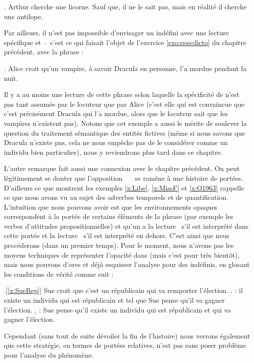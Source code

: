 \ex. \label{x:antilope}
Arthur cherche une licorne. Sauf que, il ne le sait pas, mais en réalité il cherche une antilope.

Par ailleurs, il n'est pas impossible d'envisager un indéfini avec une lecture spécifique et {\dedicto} --~c'est ce qui faisait l'objet de l'exercice \ref{exo:specdicto} du chapitre précédent, avec la phrase :

\ex. 
Alice croit qu'un vampire, à savoir Dracula en personne, l'a mordue
pendant la nuit.

Il y a au moins une lecture de cette phrase selon laquelle la spécificité de  n'est pas tant assumée par le locuteur que par Alice (c'est elle qui est convaincue que c'est précisément Dracula qui l'a mordue, alors que le locuteur sait que les vampires n'existent pas). Notons que cet exemple a aussi le mérite de soulever la question du traitement sémantique des entités fictives (même si nous savons que Dracula n'existe pas, cela ne nous empêche pas de le considérer comme un individu bien particulier), nous y reviendrons plus tard dans ce chapitre.

L'autre remarque fait aussi une connexion avec le chapitre précédent. On peut légitimement se douter que l'opposition \dedicto\ \vs\ \dere\ se ramène à  une histoire de portées. D'ailleurs ce que montrent les exemples \ref{x:Libe}, \ref{x:MissF} et \ref{x:O1963} rappelle ce que nous avons vu au sujet des adverbes temporels et de quantification.  L'intuition que nous pouvons avoir est que les environnements opaques correspondent à la portée de certains éléments de la phrase (par exemple les verbes d'attitudes propositionnelles) et qu'un {\GN} a la lecture \dedicto\ s'il est interprété dans cette portée et la lecture \dere\ s'il est interprété en dehors. C'est ainsi que nous procéderons (dans un premier temps). Pour le moment, nous n'avons pas les moyens techniques de représenter l'opacité dans {\LO} (mais c'est pour très bientôt), mais nous pouvons d'ores et déjà esquisser l'analyse pour des indéfinis, en glosant les conditions de vérité comme suit :

\ex.[\ref{x:SueRep}]
Sue {croit} que c'est {un républicain} qui va remporter l'élection.
\a. {\dere} : il existe un individu qui est républicain et tel que Sue
pense qu'il va gagner l'élection.
\b.
{\dedicto} : Sue pense qu'il existe un individu qui est républicain et
qui va gagner l'élection.  

Cependant (sans tout de suite dévoiler la fin de l'histoire) nous verrons également  que cette stratégie, en termes de portées relatives, n'est pas sans poser problème pour l'analyse du phénomène.

